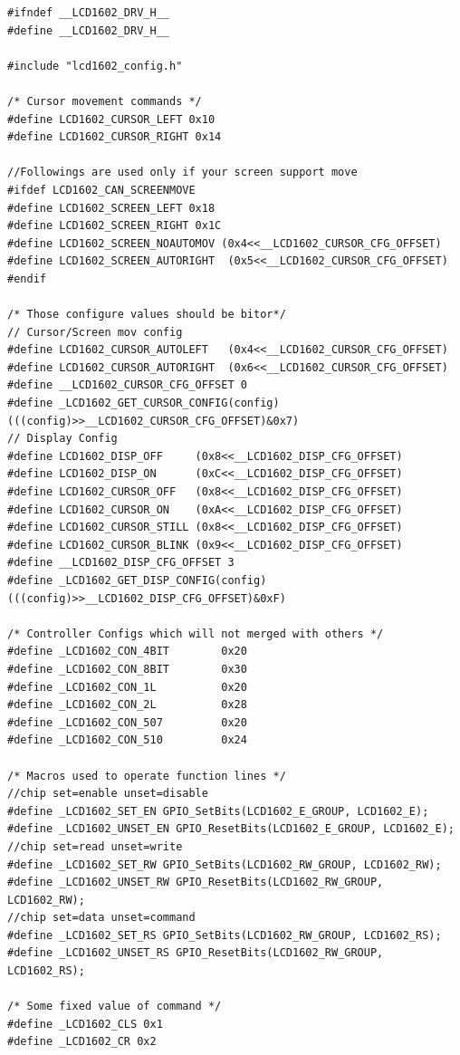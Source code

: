 \documentclass[a4paper]{ctexart}
\begin{document}
\begin{lstlisting}[caption={File lcd1602\_driver.h},label={lcd1602dh}]
#ifndef __LCD1602_DRV_H__
#define __LCD1602_DRV_H__

#include "lcd1602_config.h"

/* Cursor movement commands */
#define LCD1602_CURSOR_LEFT 0x10
#define LCD1602_CURSOR_RIGHT 0x14

//Followings are used only if your screen support move
#ifdef LCD1602_CAN_SCREENMOVE
#define LCD1602_SCREEN_LEFT 0x18
#define LCD1602_SCREEN_RIGHT 0x1C
#define LCD1602_SCREEN_NOAUTOMOV (0x4<<__LCD1602_CURSOR_CFG_OFFSET)
#define LCD1602_SCREEN_AUTORIGHT  (0x5<<__LCD1602_CURSOR_CFG_OFFSET)
#endif

/* Those configure values should be bitor*/
// Cursor/Screen mov config
#define LCD1602_CURSOR_AUTOLEFT   (0x4<<__LCD1602_CURSOR_CFG_OFFSET)
#define LCD1602_CURSOR_AUTORIGHT  (0x6<<__LCD1602_CURSOR_CFG_OFFSET)
#define __LCD1602_CURSOR_CFG_OFFSET 0
#define _LCD1602_GET_CURSOR_CONFIG(config) (((config)>>__LCD1602_CURSOR_CFG_OFFSET)&0x7)
// Display Config
#define LCD1602_DISP_OFF     (0x8<<__LCD1602_DISP_CFG_OFFSET)
#define LCD1602_DISP_ON      (0xC<<__LCD1602_DISP_CFG_OFFSET)
#define LCD1602_CURSOR_OFF   (0x8<<__LCD1602_DISP_CFG_OFFSET)
#define LCD1602_CURSOR_ON    (0xA<<__LCD1602_DISP_CFG_OFFSET)
#define LCD1602_CURSOR_STILL (0x8<<__LCD1602_DISP_CFG_OFFSET)
#define LCD1602_CURSOR_BLINK (0x9<<__LCD1602_DISP_CFG_OFFSET)
#define __LCD1602_DISP_CFG_OFFSET 3
#define _LCD1602_GET_DISP_CONFIG(config) (((config)>>__LCD1602_DISP_CFG_OFFSET)&0xF)

/* Controller Configs which will not merged with others */
#define _LCD1602_CON_4BIT		 0x20
#define _LCD1602_CON_8BIT		 0x30
#define _LCD1602_CON_1L			 0x20
#define _LCD1602_CON_2L			 0x28
#define _LCD1602_CON_507		 0x20
#define _LCD1602_CON_510		 0x24

/* Macros used to operate function lines */
//chip set=enable unset=disable
#define _LCD1602_SET_EN GPIO_SetBits(LCD1602_E_GROUP, LCD1602_E);
#define _LCD1602_UNSET_EN GPIO_ResetBits(LCD1602_E_GROUP, LCD1602_E);
//chip set=read unset=write
#define _LCD1602_SET_RW GPIO_SetBits(LCD1602_RW_GROUP, LCD1602_RW);
#define _LCD1602_UNSET_RW GPIO_ResetBits(LCD1602_RW_GROUP, LCD1602_RW);
//chip set=data unset=command
#define _LCD1602_SET_RS GPIO_SetBits(LCD1602_RW_GROUP, LCD1602_RS);
#define _LCD1602_UNSET_RS GPIO_ResetBits(LCD1602_RW_GROUP, LCD1602_RS);

/* Some fixed value of command */
#define _LCD1602_CLS 0x1
#define _LCD1602_CR 0x2


\end{lstlisting}
\end{document}
